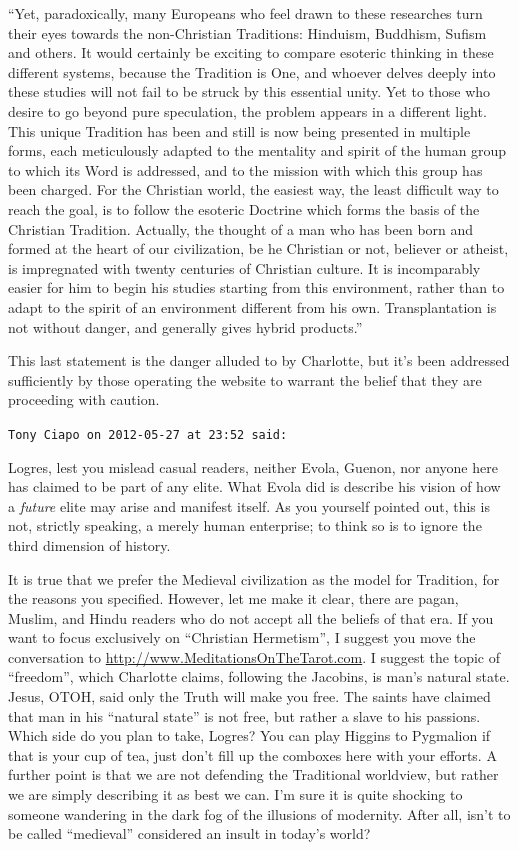 \begin{footnotesize}
\begin{sffamily}
``Yet, paradoxically, many Europeans who feel drawn to these researches turn their eyes towards the non-Christian Traditions: Hinduism, Buddhism, Sufism and others. It would certainly be exciting to compare esoteric thinking in these different systems, because the Tradition is One, and whoever delves deeply into these studies will not fail to be struck by this essential unity. Yet to those who desire to go beyond pure speculation, the problem appears in a different light. This unique Tradition has been and still is now being presented in multiple forms, each meticulously adapted to the mentality and spirit of the human group to which its Word is addressed, and to the mission with which this group has been charged. For the Christian world, the easiest way, the least difficult way to reach the goal, is to follow the esoteric Doctrine which forms the basis of the Christian Tradition. Actually, the thought of a man who has been born and formed at the heart of our civilization, be he Christian or not, believer or atheist, is impregnated with twenty centuries of Christian culture. It is incomparably easier for him to begin his studies starting from this environment, rather than to adapt to the spirit of an environment different from his own. Transplantation is not without danger, and generally gives hybrid products.''

This last statement is the danger alluded to by Charlotte, but it's been addressed sufficiently by those operating the website to warrant the belief that they are proceeding with caution.

\hfill

\texttt{Tony Ciapo on 2012-05-27 at 23:52 said:}

Logres, lest you mislead casual readers, neither Evola, Guenon, nor anyone here has claimed to be part of any elite. What Evola did is describe his vision of how a \emph{future} elite may arise and manifest itself. As you yourself pointed out, this is not, strictly speaking, a merely human enterprise; to think so is to ignore the third dimension of history.

It is true that we prefer the Medieval civilization as the model for Tradition, for the reasons you specified. However, let me make it clear, there are pagan, Muslim, and Hindu readers who do not accept all the beliefs of that era. If you want to focus exclusively on ``Christian Hermetism'', I suggest you move the conversation to \url{http://www.MeditationsOnTheTarot.com}. I suggest the topic of ``freedom'', which Charlotte claims, following the Jacobins, is man's natural state. Jesus, OTOH, said only the Truth will make you free. The saints have claimed that man in his ``natural state'' is not free, but rather a slave to his passions. Which side do you plan to take, Logres? You can play Higgins to Pygmalion if that is your cup of tea, just don't fill up the comboxes here with your efforts. A further point is that we are not defending the Traditional worldview, but rather we are simply describing it as best we can. I'm sure it is quite shocking to someone wandering in the dark fog of the illusions of modernity. After all, isn't to be called ``medieval'' considered an insult in today's world?


\end{sffamily}
\end{footnotesize}
